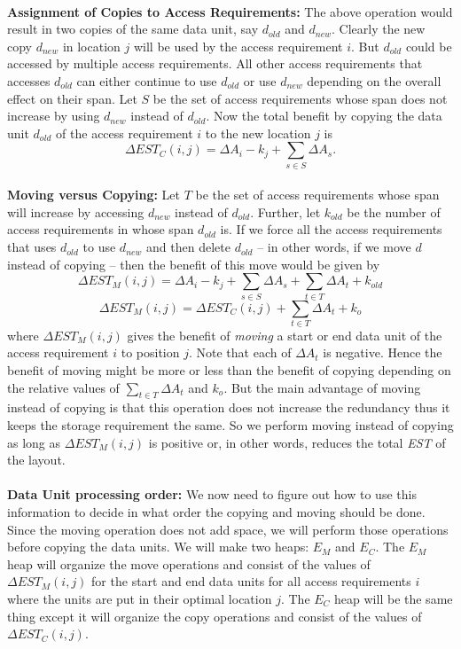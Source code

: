 \\
{\bf Assignment of Copies to Access Requirements:} The above operation would result in two copies of the same data unit, say $d_{old}$ and $d_{new}$. Clearly the new copy $d_{new}$ in location $j$ will be used by the access requirement $i$.  But $d_{old}$ could be accessed by
multiple access requirements. All other access requirements that accesses $d_{old}$ can either continue to use $d_{old}$ or use $d_{new}$ depending on the overall effect on their span. Let $S$ be the set of access requirements whose span does not increase by using $d_{new}$ instead of $d_{old}$. Now the total benefit by copying the data unit $d_{old}$ of the access requirement $i$ to the new location $j$ is
\begin{equation}
\Delta EST_C(i,j) = \Delta A_i - k_j + \sum_{s\in S}\Delta{A_s}.
\label{eq:copyingcost}
\end{equation}
\\
{\bf Moving versus Copying:} Let $T$ be the set of access requirements whose span will increase by accessing $d_{new}$ instead of $d_{old}$. Further, let $k_{old}$ be the number of access requirements in whose span $d_{old}$ is. If we force all the access requirements that uses $d_{old}$ to use $d_{new}$ and then delete $d_{old}$ -- in other words, if we move $d$ instead of copying -- then the benefit of this move would be given by
\[
 \Delta EST_M(i,j) = \Delta A_i - k_j + \sum_{s\in S}\Delta{A_s} + \sum_{t\in T}\Delta{A_t} + k_{old}
\]
\[
 \Delta EST_M(i,j) = \Delta EST_C(i,j) + \sum_{t\in T}\Delta{A_t} + k_o
\]
where $\Delta EST_M(i,j)$ gives the benefit of {\it moving} a start or end data unit of the access requirement $i$ to position $j$. Note that each of $\Delta A_t$ is negative. Hence the benefit of moving might be more or less than the benefit of copying depending on the relative values of $\sum_{t\in T}\Delta{A_t}$ and $k_o$. But the main advantage of moving instead of copying is that this operation does not increase the redundancy thus it keeps the storage requirement the same. So we perform moving instead of copying as long as $\Delta EST_M(i,j)$ is positive or, in other words, reduces the total {\em EST} of the layout.\\
\\
{\bf Data Unit processing order:} We now need to figure out how to use this
information to decide in what order the copying and moving should be done. Since the moving operation does not add space, we will perform those operations before copying the data units. We will make two heaps: $E_M$ and $E_C$. The $E_M$ heap will organize the move operations and consist of the values of $\Delta EST_M(i,j)$ for the start and end data units for all access requirements $i$ where the units are put in their optimal location $j$. The $E_C$ heap will be the same thing except it will organize the copy operations and consist of the values of $\Delta EST_C(i,j)$.


